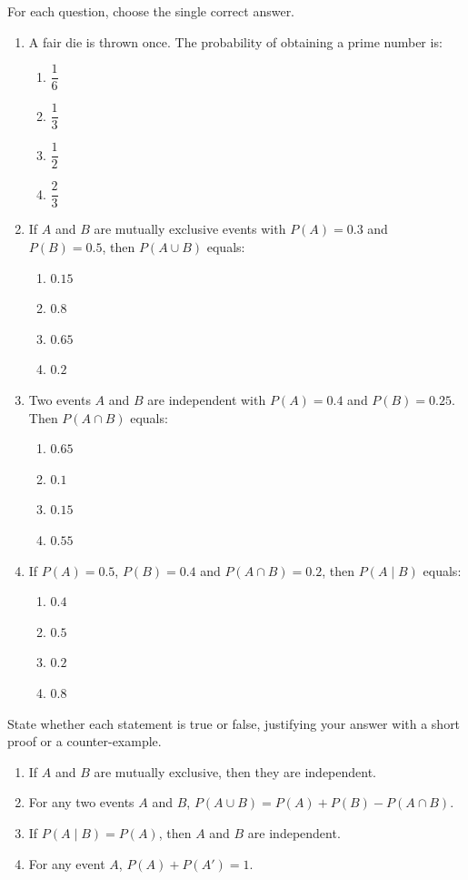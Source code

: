\documentclass[11pt]{article}
\begin{document}
\begin{exercice}
For each question, choose the single correct answer.
\begin{enumerate}
\item A fair die is thrown once. The probability of obtaining a prime number is:
\begin{enumerate}
\item $\dfrac{1}{6}$ \item $\dfrac{1}{3}$ \item $\dfrac{1}{2}$ \item $\dfrac{2}{3}$
\end{enumerate}
\item If $A$ and $B$ are mutually exclusive events with $P(A)=0.3$ and $P(B)=0.5$, then $P(A\cup B)$ equals:
\begin{enumerate}
\item $0.15$ \item $0.8$ \item $0.65$ \item $0.2$
\end{enumerate}
\item Two events $A$ and $B$ are independent with $P(A)=0.4$ and $P(B)=0.25$. Then $P(A\cap B)$ equals:
\begin{enumerate}
\item $0.65$ \item $0.1$ \item $0.15$ \item $0.55$
\end{enumerate}
\item If $P(A)=0.5$, $P(B)=0.4$ and $P(A\cap B)=0.2$, then $P(A\mid B)$ equals:
\begin{enumerate}
\item $0.4$ \item $0.5$ \item $0.2$ \item $0.8$
\end{enumerate}
\end{enumerate}
\end{exercice}

\begin{exercice}
State whether each statement is true or false, justifying your answer with a short proof or a counter-example.
\begin{enumerate}
\item If $A$ and $B$ are mutually exclusive, then they are independent.
\item For any two events $A$ and $B$, $P(A\cup B)=P(A)+P(B)-P(A\cap B)$.
\item If $P(A\mid B)=P(A)$, then $A$ and $B$ are independent.
\item For any event $A$, $P(A)+P(A')=1$.
\end{enumerate}
\end{exercice}
\end{document}
